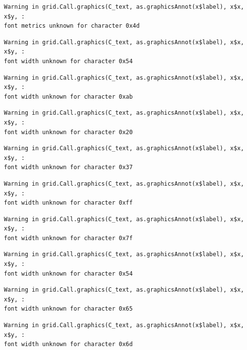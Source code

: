 \documentclass[
  letterpaper,
]{scrbook}
\begin{document}
\begin{verbatim}
Warning in grid.Call.graphics(C_text, as.graphicsAnnot(x$label), x$x, x$y, :
font metrics unknown for character 0x4d
\end{verbatim}

\begin{verbatim}
Warning in grid.Call.graphics(C_text, as.graphicsAnnot(x$label), x$x, x$y, :
font width unknown for character 0x54
\end{verbatim}

\begin{verbatim}
Warning in grid.Call.graphics(C_text, as.graphicsAnnot(x$label), x$x, x$y, :
font width unknown for character 0xab
\end{verbatim}

\begin{verbatim}
Warning in grid.Call.graphics(C_text, as.graphicsAnnot(x$label), x$x, x$y, :
font width unknown for character 0x20
\end{verbatim}

\begin{verbatim}
Warning in grid.Call.graphics(C_text, as.graphicsAnnot(x$label), x$x, x$y, :
font width unknown for character 0x37
\end{verbatim}

\begin{verbatim}
Warning in grid.Call.graphics(C_text, as.graphicsAnnot(x$label), x$x, x$y, :
font width unknown for character 0xff
\end{verbatim}

\begin{verbatim}
Warning in grid.Call.graphics(C_text, as.graphicsAnnot(x$label), x$x, x$y, :
font width unknown for character 0x7f
\end{verbatim}

\begin{verbatim}
Warning in grid.Call.graphics(C_text, as.graphicsAnnot(x$label), x$x, x$y, :
font width unknown for character 0x54
\end{verbatim}

\begin{verbatim}
Warning in grid.Call.graphics(C_text, as.graphicsAnnot(x$label), x$x, x$y, :
font width unknown for character 0x65
\end{verbatim}

\begin{verbatim}
Warning in grid.Call.graphics(C_text, as.graphicsAnnot(x$label), x$x, x$y, :
font width unknown for character 0x6d
\end{verbatim}
\end{document}
